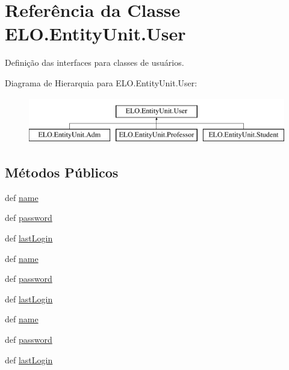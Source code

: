 \hypertarget{classELO_1_1EntityUnit_1_1User}{\section{Referência da Classe E\-L\-O.\-Entity\-Unit.\-User}
\label{classELO_1_1EntityUnit_1_1User}
}


Definição das interfaces para classes de usuários.  


Diagrama de Hierarquia para E\-L\-O.\-Entity\-Unit.\-User\-:\begin{figure}[H]
\begin{center}
\leavevmode
\includegraphics[height=2.000000cm]{dd/d09/classELO_1_1EntityUnit_1_1User}
\end{center}
\end{figure}
\subsection*{Métodos Públicos}
\begin{DoxyCompactItemize}
\item 
def \hyperlink{classELO_1_1EntityUnit_1_1User_ad8e94293952f8018f67b59327900c429}{name}
\item 
def \hyperlink{classELO_1_1EntityUnit_1_1User_a01ae16d257db991dd048c84dba5034c0}{password}
\item 
def \hyperlink{classELO_1_1EntityUnit_1_1User_a96e14d87d9a761c3c71d47dec07e1598}{last\-Login}
\item 
def \hyperlink{classELO_1_1EntityUnit_1_1User_ad8e94293952f8018f67b59327900c429}{name}
\item 
def \hyperlink{classELO_1_1EntityUnit_1_1User_a01ae16d257db991dd048c84dba5034c0}{password}
\item 
def \hyperlink{classELO_1_1EntityUnit_1_1User_a96e14d87d9a761c3c71d47dec07e1598}{last\-Login}
\item 
def \hyperlink{classELO_1_1EntityUnit_1_1User_ad8e94293952f8018f67b59327900c429}{name}
\item 
def \hyperlink{classELO_1_1EntityUnit_1_1User_a01ae16d257db991dd048c84dba5034c0}{password}
\item 
def \hyperlink{classELO_1_1EntityUnit_1_1User_a96e14d87d9a761c3c71d47dec07e1598}{last\-Login}
\end{DoxyCompactItemize}


